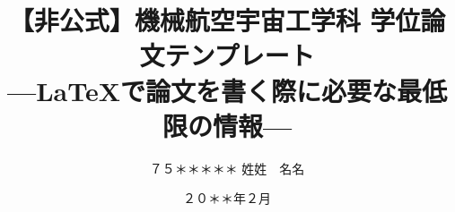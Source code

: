 \documentclass[
    paper=a4paper,      %
    report,             %
    fleqn,              %
    fontsize=12pt,      %
    jafontsize=12pt,    %
    head_space=33mm,    %
    foot_space=30mm,    %
    gutter=25mm,        %
    fore-edge=10mm      %
    ]{jlreq}            %
\begin{document}


\title{【非公式】機械航空宇宙工学科 学位論文テンプレート\\ ---\LaTeX で論文を書く際に必要な最低限の情報---}

\date{２０＊＊年２月}




\author{%
７５＊＊＊＊＊
\zw%
姓姓　名名
} %

\makecover

\pagestyle{empty}
\def\thepage{}
\tableofcontents



\clearpage
\pagestyle{normal}
\setcounter{page}{0}

















\biblist





\end{document}
